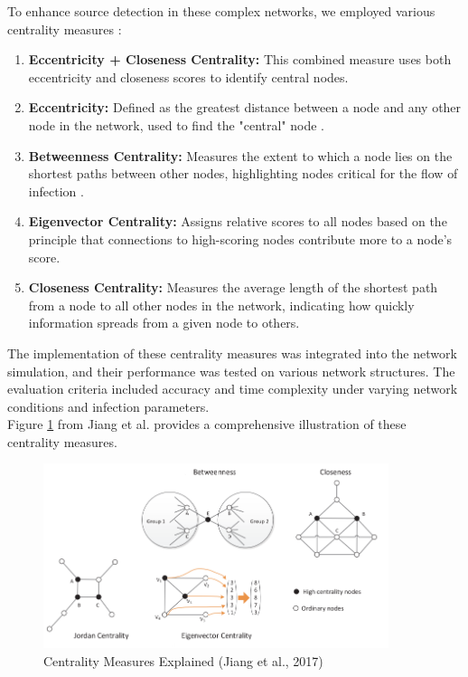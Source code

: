 To enhance source detection in these complex networks, we employed various centrality measures \cite{jiang2017}:
\label{centrality_measure}
\begin{enumerate}
    \item \textbf{Eccentricity + Closeness Centrality:} This combined measure uses both eccentricity and closeness scores to identify central nodes. 
    \item \textbf{Eccentricity:} Defined as the greatest distance between a node and any other node in the network, used to find the "central" node \cite{newman2010}.
    \item \textbf{Betweenness Centrality:} Measures the extent to which a node lies on the shortest paths between other nodes, highlighting nodes critical for the flow of infection \cite{girvan2002}.
    \item \textbf{Eigenvector Centrality:} Assigns relative scores to all nodes based on the principle that connections to high-scoring nodes contribute more to a node's score.
    \item \textbf{Closeness Centrality:} Measures the average length of the shortest path from a node to all other nodes in the network, indicating how quickly information spreads from a given node to others.
\end{enumerate}

The implementation of these centrality measures was integrated into the network simulation, and their performance was tested on various network structures. The evaluation criteria included accuracy and time complexity under varying network conditions and infection parameters.\\

Figure \ref{fig:centrality_measures_explained} from Jiang et al. \cite{jiang2017} provides a comprehensive illustration of these centrality measures.

\begin{figure}[H]
    \centering
    \includegraphics[width=0.9\textwidth]{centrality_measures.png}
    \caption{Centrality Measures Explained (Jiang et al., 2017)}
    \label{fig:centrality_measures_explained}
\end{figure}


